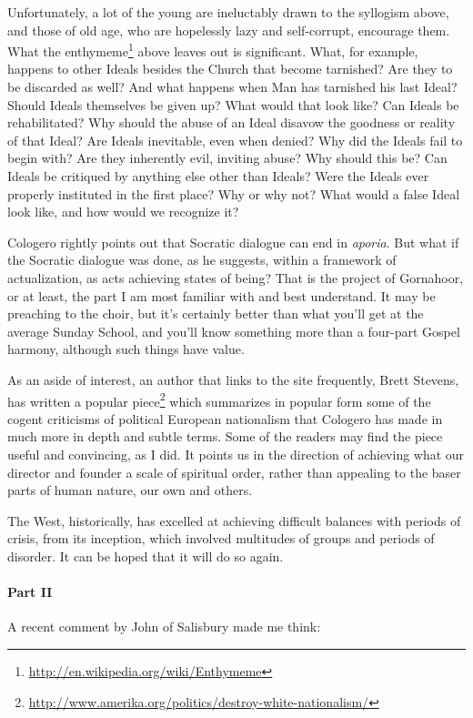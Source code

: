 Unfortunately, a lot of the young are ineluctably drawn to the syllogism above, and those of old age, who are hopelessly lazy and self-corrupt, encourage them. What the enthymeme\footnote{\url{http://en.wikipedia.org/wiki/Enthymeme}} above leaves out is significant. What, for example, happens to other Ideals besides the Church that become tarnished? Are they to be discarded as well? And what happens when Man has tarnished his last Ideal? Should Ideals themselves be given up? What would that look like? Can Ideals be rehabilitated? Why should the abuse of an Ideal disavow the goodness or reality of that Ideal? Are Ideals inevitable, even when denied? Why did the Ideals fail to begin with? Are they inherently evil, inviting abuse? Why should this be? Can Ideals be critiqued by anything else other than Ideals? Were the Ideals ever properly instituted in the first place? Why or why not? What would a false Ideal look like, and how would we recognize it?

Cologero rightly points out that Socratic dialogue can end in \emph{aporia}. But what if the Socratic dialogue was done, as he suggests, within a framework of actualization, as acts achieving states of being? That is the project of Gornahoor, or at least, the part I am most familiar with and best understand. It may be preaching to the choir, but it's certainly better than what you'll get at the average Sunday School, and you'll know something more than a four-part Gospel harmony, although such things have value.

As an aside of interest, an author that links to the site frequently, Brett Stevens, has written a popular piece\footnote{\url{http://www.amerika.org/politics/destroy-white-nationalism/}} which summarizes in popular form some of the cogent criticisms of political European nationalism that Cologero has made in much more in depth and subtle terms. Some of the readers may find the piece useful and convincing, as I did. It points us in the direction of achieving what our director and founder a scale of spiritual order, rather than appealing to the baser parts of human nature, our own and others.

The West, historically, has excelled at achieving difficult balances with periods of crisis, from its inception, which involved multitudes of groups and periods of disorder. It can be hoped that it will do so again.

\paragraph{Part II} A recent comment by John of Salisbury made me think:

